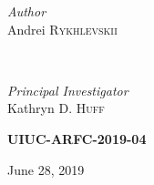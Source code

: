\documentclass[12pt]{article} %
\begin{document}
\begin{titlepage}
\begin{minipage}{0.6\textwidth}
        \end{minipage}

    \vspace{0.2cm}
    \HRule
    \vspace{0.5cm}
    
    
    \begin{minipage}{0.4\textwidth}
        \begin{flushleft}
            \large
            \textit{Author}\\
            Andrei \textsc{Rykhlevskii}\\
        \end{flushleft}
    \end{minipage}
    ~
    \begin{minipage}{0.4\textwidth}
        \begin{flushright}
            \large
            \textit{Principal Investigator}\\
            Kathryn D. \textsc{Huff} %
        \end{flushright}
    \end{minipage}
    

    \vspace{1cm}
    \textsc{\LARGE\bfseries UIUC-ARFC-2019-04} %
    \vspace{0.5cm}
    
    
    \vspace{0.5cm} %
    {\large June 28, 2019} %
    \vspace{0.5cm}

    

\end{titlepage}
\end{document}
